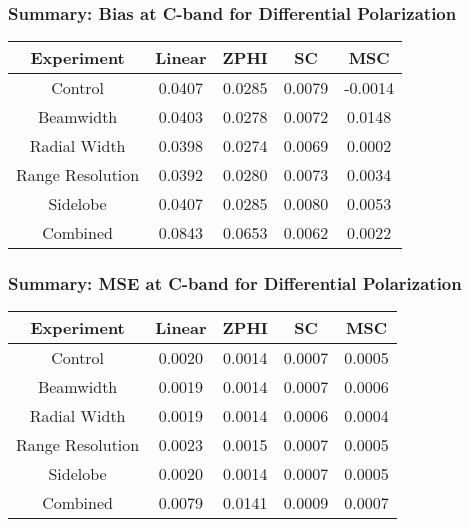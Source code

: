 \begin{frame}
    \frametitle{Summary: Bias at C-band for Differential Polarization}
    \begin{center}
        \begin{tabular}{| c | c | c | c | c |}
            \hline
            Experiment & Linear & ZPHI & SC & MSC \\
            \hline
            \hline
            Control & 0.0407 & 0.0285 & 0.0079 & -0.0014 \\
            Beamwidth & 0.0403 & 0.0278 & 0.0072 & 0.0148 \\
            Radial Width & 0.0398 & 0.0274 & 0.0069 & 0.0002 \\
            Range Resolution & 0.0392 & 0.0280 & 0.0073 & 0.0034 \\
            Sidelobe & 0.0407 & 0.0285 & 0.0080 & 0.0053 \\
            Combined & 0.0843 & 0.0653 & 0.0062 & 0.0022 \\
            \hline
        \end{tabular}
    \end{center}
\end{frame}

\begin{frame}
    \frametitle{Summary: MSE at C-band for Differential Polarization}
    \begin{center}
        \begin{tabular}{| c | c | c | c | c |}
            \hline
            Experiment & Linear & ZPHI & SC & MSC \\
            \hline
            \hline
            Control & 0.0020 & 0.0014 & 0.0007 & 0.0005 \\
            Beamwidth & 0.0019 & 0.0014 & 0.0007 & 0.0006 \\
            Radial Width & 0.0019 & 0.0014 & 0.0006 & 0.0004 \\
            Range Resolution & 0.0023 & 0.0015 & 0.0007 & 0.0005 \\
            Sidelobe & 0.0020 & 0.0014 & 0.0007 & 0.0005 \\
            Combined & 0.0079 & 0.0141 & 0.0009 & 0.0007 \\
            \hline
        \end{tabular}
    \end{center}
\end{frame}

